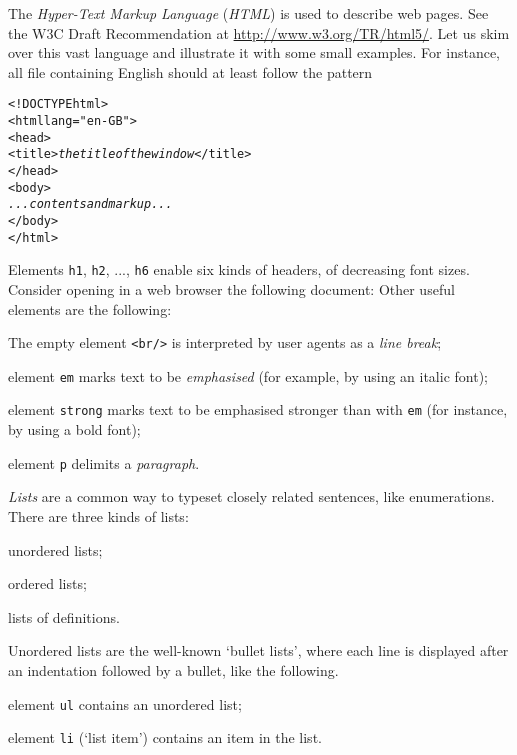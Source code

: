 The \emph{Hyper-Text Markup Language} (\emph{\textsf{HTML}}) is used
to describe web pages. See the W3C Draft Recommendation at
\url{http://www.w3.org/TR/html5/}. Let us skim over this vast language
and illustrate it with some small examples. For instance, all \HTML
file containing English should at least follow the pattern
\begin{alltt}
<!DOCTYPE html>
<html lang="en-GB">
  <head>
    <title>\textit{the title of the window}</title>
  </head>
  <body>
     \emph{...contents and markup...}
  </body>
</html>
\end{alltt}
Elements \texttt{h1}, \texttt{h2}, ..., \texttt{h6} enable six kinds
of headers, of decreasing font sizes. Consider opening in a web
browser the following document: 
\noindent Other useful elements are the following:
\begin{itemize*}

  \item The empty element \texttt{<br/>} is interpreted by
    user agents as a \emph{line break};

  \item element \texttt{em} marks text to be \emph{emphasised}
    (for example, by using an italic font);

  \item element \texttt{strong} marks text to be emphasised stronger
    than with \texttt{em} (for instance, by using a bold font);

  \item element \texttt{p} delimits a \emph{paragraph}.

\end{itemize*}
\emph{Lists} are a common way to typeset closely related sentences,
like enumerations. There are three kinds of lists:
\begin{enumerate*}
 
  \item unordered lists;

  \item ordered lists;

  \item lists of definitions.

\end{enumerate*}
Unordered lists are the well\hyp{}known `bullet lists', where each
line is displayed after an indentation followed by a bullet, like the
following.
\begin{itemize*}

  \item element \texttt{ul} contains an unordered list;

  \item element \texttt{li} (`list item') contains an item in the
    list.

\end{itemize*}
